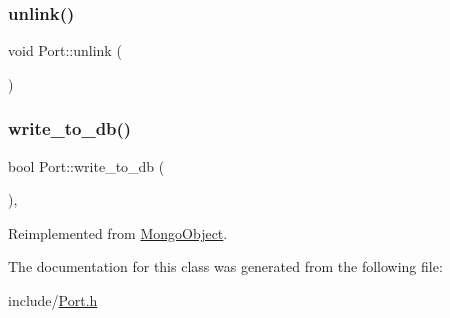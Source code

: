 \mbox{\label{class_port_aa6a264b13dc26edd20a2726c9466186c}} 
\subsubsection{\texorpdfstring{unlink()}{unlink()}}
{\footnotesize\ttfamily void Port\+::unlink (\begin{DoxyParamCaption}{ }\end{DoxyParamCaption})}

\mbox{\label{class_port_a052c0ba97e0a53e45d973d4bc31fa615}} 
\subsubsection{\texorpdfstring{write\+\_\+to\+\_\+db()}{write\_to\_db()}}
{\footnotesize\ttfamily bool Port\+::write\+\_\+to\+\_\+db (\begin{DoxyParamCaption}{ }\end{DoxyParamCaption})\hspace{0.3cm}{\ttfamily [inline]}, {\ttfamily [virtual]}}



Reimplemented from \hyperlink{class_mongo_object_a65971bad07dce8b649820f9dee5d0ae8}{Mongo\+Object}.



The documentation for this class was generated from the following file\+:\begin{DoxyCompactItemize}
\item 
include/\hyperlink{_port_8h}{Port.\+h}\end{DoxyCompactItemize}
